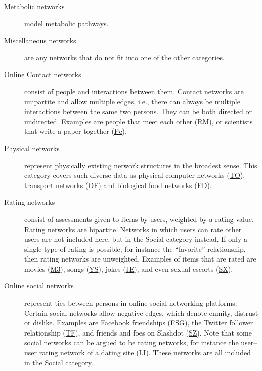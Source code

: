 \documentclass{article}
\begin{document}
\begin{description}
\item[Metabolic networks] model metabolic pathways. 

\item[Miscellaneous networks] are any networks that do not fit into one
  of the other categories. 
  
\item[Online Contact networks] consist of people and interactions between
  them. 
  Contact networks are unipartite and allow multiple edges, i.e., there
  can always be multiple interactions between the same two persons.
  They can be both directed or undirected.
  Examples are people that meet each other
  (\href{http://konect.uni-koblenz.de/networks/mit}{\textsf{RM}}), or
  scientists that write a paper together
  (\href{http://konect.uni-koblenz.de/networks/dblp_coauthor}{\textsf{Pc}}).

\item[Physical networks] represent physically existing network
  structures in the broadest sense.  This category covers such diverse data as
  physical computer networks
  (\href{http://konect.uni-koblenz.de/networks/topology}{\textsf{TO}}),
  transport networks
  (\href{http://konect.uni-koblenz.de/networks/opsahl-openflights}{\textsf{OF}})
  and biological food networks
  (\href{http://konect.uni-koblenz.de/networks/foodweb-baydry}{\textsf{FD}}).   

\item[Rating networks] consist of assessments given to items by users,
  weighted by a rating value.  Rating networks are bipartite.  
  Networks in which users can rate other users are not included here,
  but in the Social category instead.  If only a single type of rating
  is possible, for instance the ``favorite'' relationship, then rating
  networks are unweighted.  Examples of items that are rated are movies
  (\href{http://konect.uni-koblenz.de/networks/movielens-10m_rating}{\textsf{M3}}), 
  songs
  (\href{http://konect.uni-koblenz.de/networks/yahoo-song}{\textsf{YS}}),
  jokes
  (\href{http://konect.uni-koblenz.de/networks/jester}{\textsf{JE}}),
  and even sexual escorts
  (\href{http://konect.uni-koblenz.de/networks/escorts}{\textsf{SX}}).   

\item[Online social networks] represent ties between
  persons in online social networking platforms.  Certain social
  networks allow negative edges, which denote 
  enmity, distrust or dislike.
  Examples are Facebook friendships
  (\href{http://konect.uni-koblenz.de/networks/facebook-sg}{\textsf{FSG}}),
  the Twitter follower relationship
  (\href{http://konect.uni-koblenz.de/networks/twitter_mpi}{\textsf{TF}}), 
  and friends and foes on Slashdot
  (\href{http://konect.uni-koblenz.de/networks/slashdot-zoo}{\textsf{SZ}}).  
  Note that some social networks can be argued to be rating networks,
  for instance the 
  user--user rating network of a dating site
  (\href{http://konect.uni-koblenz.de/networks/libimseti}{\textsf{LI}}). 
  These networks are all included in the Social category. 


\end{description}
\end{document}
